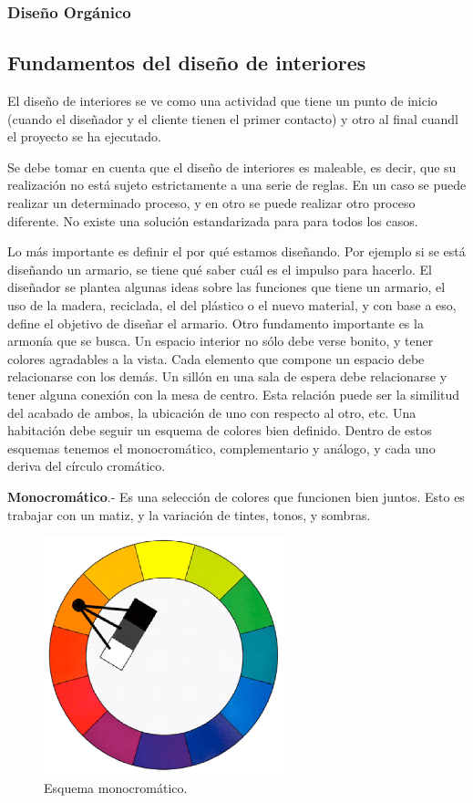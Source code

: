 \subsubsection{Diseño Orgánico}

\subsection{Fundamentos del diseño de interiores}
El diseño de interiores se ve como una actividad que tiene un punto de inicio (cuando el diseñador y el cliente tienen el primer contacto) y otro al final cuandl el proyecto se ha ejecutado.\par
Se debe tomar en cuenta que el diseño de interiores es maleable, es decir, que su realización no está sujeto estrictamente a una serie de reglas. En un caso se puede realizar un determinado proceso, y en otro se puede realizar otro proceso diferente. No existe una solución estandarizada para para todos los casos.\par
Lo más importante es definir el por qué estamos diseñando. Por ejemplo si se está diseñando un armario, se tiene qué saber cuál es el impulso para hacerlo. El diseñador se plantea algunas ideas sobre las funciones que tiene un armario, el uso de la madera, reciclada, el del plástico o el nuevo material, y con base a eso, define el objetivo de diseñar el armario.
Otro fundamento importante es la armonía que se busca. Un espacio interior no sólo debe verse bonito, y tener colores agradables a la vista. Cada elemento que compone un espacio debe relacionarse con los demás. Un sillón en una sala de espera debe relacionarse y tener alguna conexión con la mesa de centro. Esta relación puede ser la similitud del acabado de ambos, la ubicación de uno con respecto al otro, etc.
Una habitación debe seguir un esquema de colores bien definido. Dentro de estos esquemas tenemos el monocromático, complementario y análogo, y cada uno deriva del círculo cromático.\par

\textbf{Monocromático}.- Es una selección de colores que funcionen bien juntos. Esto es trabajar con un matiz, y la variación de tintes, tonos, y sombras.
\begin{figure}[h!]
	\centering
	\includegraphics[width=7cm]{imagenes/marcoteorico/disenointeriores/monocromatico.png}
	\caption{Esquema monocromático.\cite{B13}}
	\label{fig:monocromatico}
\end{figure}

